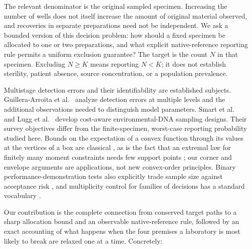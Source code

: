 \documentclass[11pt]{article}
\theoremstyle{remark}\newtheorem{remark}[theorem]{Remark}
\begin{document}
The relevant denominator is the original sampled specimen. Increasing the number
of wells does not itself increase the amount of original material observed, and
recoveries in separate preparations need not be independent. We ask a bounded
version of this decision problem: how should a fixed specimen be allocated to one
or two preparations, and what explicit native-reference reporting rule permits a
uniform exclusion guarantee? The target is the count $N$ in that specimen.
Excluding $N\ge K$ means reporting $N<K$; it does not establish sterility,
patient absence, source concentration, or a population prevalence.

Multistage detection errors and their identifiability are established subjects.
Guillera-Arroita et al.\ \cite{guillera2017} analyze detection errors at multiple
levels and the additional observations needed to distinguish model parameters.
Smart et al.\ \cite{smart2016} and Lugg et al.\ \cite{lugg2018} develop
cost-aware environmental-DNA sampling designs. Their survey objectives differ
from the finite-specimen, worst-case reporting probability studied here. Bounds
on the expectation of a convex function through its values at the vertices of a
box are classical \cite{madansky1959,hoeffding1955}, as is the fact that an
extremal law for finitely many moment constraints needs few support points
\cite{karlin1966,winkler1988}; our corner and envelope arguments are applications,
not new convex-order principles. Binary performance-demonstration tests also
explicitly trade sample size against acceptance risk \cite{leber2019}, and
multiplicity control for families of decisions has a standard vocabulary
\cite{benjamini1995}.

Our contribution is the complete connection from conserved target paths to a
sharp allocation bound and an observable native-reference rule, followed by an
exact accounting of what happens when the four premises a laboratory is most
likely to break are relaxed one at a time. Concretely:
\end{document}
